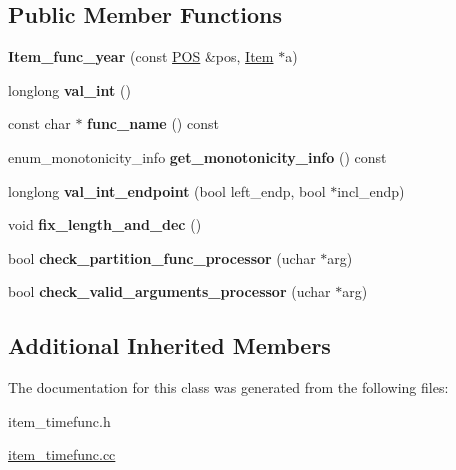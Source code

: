 \subsection*{Public Member Functions}
\begin{DoxyCompactItemize}
\item 
\mbox{\label{classItem__func__year_a7cabb478a014c1d15107b892d78d171a}} 
{\bfseries Item\+\_\+func\+\_\+year} (const \mbox{\hyperlink{structYYLTYPE}{P\+OS}} \&pos, \mbox{\hyperlink{classItem}{Item}} $\ast$a)
\item 
\mbox{\label{classItem__func__year_af858ad21c59f78e60d0446e4ae1f8d84}} 
longlong {\bfseries val\+\_\+int} ()
\item 
\mbox{\label{classItem__func__year_a1db1bf8284e3f0fdca792a863e41f1a1}} 
const char $\ast$ {\bfseries func\+\_\+name} () const
\item 
\mbox{\label{classItem__func__year_acf52fdb105e0a70b4954464b7918bfa6}} 
enum\+\_\+monotonicity\+\_\+info {\bfseries get\+\_\+monotonicity\+\_\+info} () const
\item 
\mbox{\label{classItem__func__year_aa27637a16b645e6ac35afb5a5f7a3238}} 
longlong {\bfseries val\+\_\+int\+\_\+endpoint} (bool left\+\_\+endp, bool $\ast$incl\+\_\+endp)
\item 
\mbox{\label{classItem__func__year_a952f18d01cb91541d050d764ee3be331}} 
void {\bfseries fix\+\_\+length\+\_\+and\+\_\+dec} ()
\item 
\mbox{\label{classItem__func__year_af511ac156e8a4016152ace077fd14634}} 
bool {\bfseries check\+\_\+partition\+\_\+func\+\_\+processor} (uchar $\ast$arg)
\item 
\mbox{\label{classItem__func__year_a8a4aac6a8b52e5ead59d4f9ae8474350}} 
bool {\bfseries check\+\_\+valid\+\_\+arguments\+\_\+processor} (uchar $\ast$arg)
\end{DoxyCompactItemize}
\subsection*{Additional Inherited Members}


The documentation for this class was generated from the following files\+:\begin{DoxyCompactItemize}
\item 
item\+\_\+timefunc.\+h\item 
\mbox{\hyperlink{item__timefunc_8cc}{item\+\_\+timefunc.\+cc}}\end{DoxyCompactItemize}
